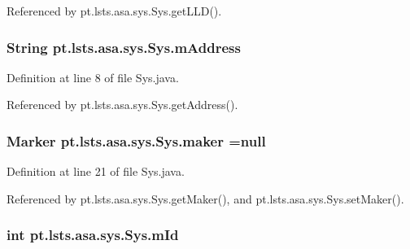 Referenced by pt.\+lsts.\+asa.\+sys.\+Sys.\+get\+L\+L\+D().

\hypertarget{classpt_1_1lsts_1_1asa_1_1sys_1_1Sys_adc306cc2f9bdf3006383c7612c5125c6}{}
\subsubsection[{m\+Address}]{\setlength{\rightskip}{0pt plus 5cm}String pt.\+lsts.\+asa.\+sys.\+Sys.\+m\+Address\hspace{0.3cm}{\ttfamily [private]}}\label{classpt_1_1lsts_1_1asa_1_1sys_1_1Sys_adc306cc2f9bdf3006383c7612c5125c6}


Definition at line 8 of file Sys.\+java.



Referenced by pt.\+lsts.\+asa.\+sys.\+Sys.\+get\+Address().

\hypertarget{classpt_1_1lsts_1_1asa_1_1sys_1_1Sys_adae0c402ab1bf93eef2e5cd7b7acafe4}{}
\subsubsection[{maker}]{\setlength{\rightskip}{0pt plus 5cm}Marker pt.\+lsts.\+asa.\+sys.\+Sys.\+maker =null\hspace{0.3cm}{\ttfamily [private]}}\label{classpt_1_1lsts_1_1asa_1_1sys_1_1Sys_adae0c402ab1bf93eef2e5cd7b7acafe4}


Definition at line 21 of file Sys.\+java.



Referenced by pt.\+lsts.\+asa.\+sys.\+Sys.\+get\+Maker(), and pt.\+lsts.\+asa.\+sys.\+Sys.\+set\+Maker().

\hypertarget{classpt_1_1lsts_1_1asa_1_1sys_1_1Sys_ad0bd9feb2771224b99c8fcfb39f1baac}{}
\subsubsection[{m\+Id}]{\setlength{\rightskip}{0pt plus 5cm}int pt.\+lsts.\+asa.\+sys.\+Sys.\+m\+Id\hspace{0.3cm}{\ttfamily [private]}}\label{classpt_1_1lsts_1_1asa_1_1sys_1_1Sys_ad0bd9feb2771224b99c8fcfb39f1baac}


